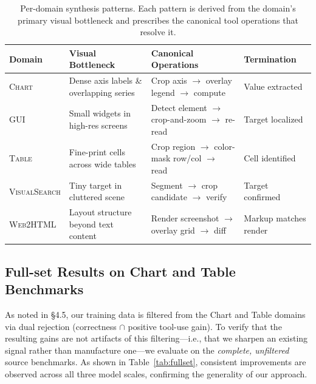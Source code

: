 \begin{table}[t]
\centering
\small
\caption{Per-domain synthesis patterns. Each pattern is derived from the domain's primary visual bottleneck and prescribes the canonical tool operations that resolve it.}
\label{tab:patterns}
\begin{tabular}{llll}
\toprule
\textbf{Domain} & \textbf{Visual Bottleneck} & \textbf{Canonical Operations} & \textbf{Termination} \\
\midrule
\textsc{Chart} & Dense axis labels \& overlapping series & Crop axis $\to$ overlay legend $\to$ compute & Value extracted \\
\textsc{GUI} & Small widgets in high-res screens & Detect element $\to$ crop-and-zoom $\to$ re-read & Target localized \\
\textsc{Table} & Fine-print cells across wide tables & Crop region $\to$ color-mask row/col $\to$ read & Cell identified \\
\textsc{VisualSearch} & Tiny target in cluttered scene & Segment $\to$ crop candidate $\to$ verify & Target confirmed \\
\textsc{Web2HTML} & Layout structure beyond text content & Render screenshot $\to$ overlay grid $\to$ diff & Markup matches render \\
\bottomrule
\end{tabular}
\end{table}

\subsection{Full-set Results on Chart and Table Benchmarks}
\label{app:fullset}

As noted in \S4.5, our training data is filtered from the Chart and Table domains via dual rejection (correctness $\cap$ positive tool-use gain). To verify that the resulting gains are not artifacts of this filtering—i.e., that we sharpen an existing signal rather than manufacture one—we evaluate on the \emph{complete, unfiltered} source benchmarks. As shown in Table~\ref{tab:fullset}, consistent improvements are observed across all three model scales, confirming the generality of our approach.


